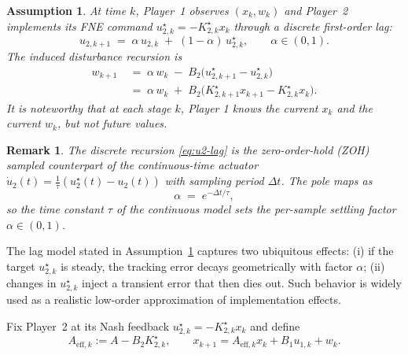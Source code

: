 \documentclass[letterpaper, 10 pt, conference]{ieeeconf}  %
\newtheorem{assumption}{\textbf{Assumption}}
\newtheorem{remark}{\textbf{Remark}}
\begin{document}
\begin{assumption}
\label{ass:info-lag}
At time $k$, Player~1 observes $(x_k,w_k)$ and Player~2 implements its FNE command $u^{\star}_{2,k}=-K^{\star}_{2,k}x_k$ through a discrete first-order lag:
\begin{equation}\label{eq:u2-lag}
u_{2,k+1} \;=\; \alpha\,u_{2,k} \;+\; (1-\alpha)\,u^{\star}_{2,k}, \qquad \alpha\in(0,1).
\end{equation}
The induced disturbance recursion is
\begin{equation}\label{eq:w-lag}
\begin{aligned}
w_{k+1} &\;=\; \alpha\,w_k \;-\; B_2\big(u^{\star}_{2,k+1}-u^{\star}_{2,k}\big)\\
&\;=\; \alpha\,w_k \;+\; B_2\!\big(K^{\star}_{2,k+1}x_{k+1}-K^{\star}_{2,k}x_k\big).
\end{aligned}
\end{equation}
It is noteworthy that at each stage $k$, Player 1 knows the current $x_k$ and the current $w_k$, but not future values.
\end{assumption}

\begin{remark}
\label{rem:alpha-tau}
The discrete recursion \eqref{eq:u2-lag} is the zero-order-hold (ZOH) sampled counterpart of the continuous-time actuator $\dot u_2(t)=\tfrac{1}{\tau}(u_2^{\star}(t)-u_2(t))$ with sampling period $\Delta t$. The pole maps as
\begin{equation}\label{eq:alpha-tau}
\alpha \;=\; e^{-\Delta t/\tau},
\end{equation}
so the time constant $\tau$ of the continuous model sets the per-sample settling factor $\alpha\in(0,1)$.
\end{remark}


The lag model stated in Assumption~\ref{ass:info-lag}  captures two ubiquitous effects: (i) if the target $u^{\star}_{2,k}$ is steady, the tracking error decays geometrically with factor $\alpha$; (ii) changes in $u^{\star}_{2,k}$ inject a transient error that then dies out. Such behavior is widely used as a realistic low-order approximation of implementation effects.


Fix Player~2 at its Nash feedback $u^{\star}_{2,k}=-K^{\star}_{2,k}x_k$ and define
\begin{equation}\label{eq:Aeff-def}
A_{\mathrm{eff},k}:=A-B_2K^{\star}_{2,k},\qquad
x_{k+1}=A_{\mathrm{eff},k}x_k+B_1u_{1,k}+w_k .
\end{equation}
\end{document}
